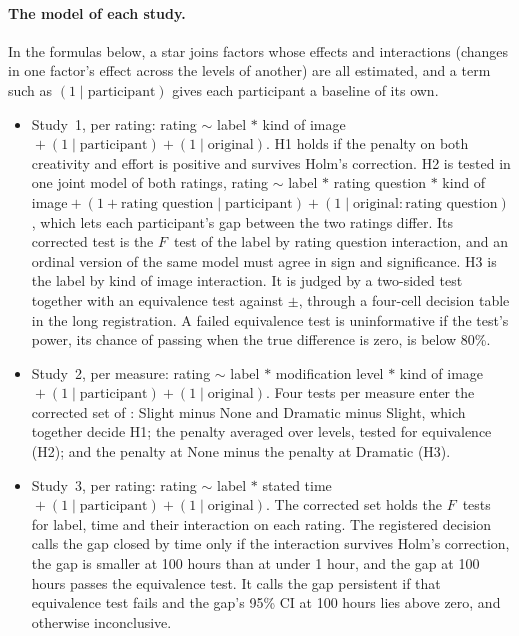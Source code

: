 \paragraph*{The model of each study.}
In the formulas below, a star joins factors whose effects and interactions (changes in one factor's effect across the levels of another) are all estimated, and a term such as $(1 \mid \textrm{participant})$ gives each participant a baseline of its own.
\begin{itemize}\raggedright
\item Study~1, per rating: rating $\sim$ label $*$ kind of image${}+ (1 \mid \textrm{participant}) + (1 \mid \textrm{original})$. H1 holds if the penalty on both creativity and effort is positive and survives Holm's correction. H2 is tested in one joint model of both ratings, rating $\sim$ label $*$ rating question $*$ kind of image${}+ (1 + \textrm{rating question} \mid \textrm{participant}) + (1 \mid \textrm{original}{:}\textrm{rating question})$, which lets each participant's gap between the two ratings differ. Its corrected test is the $F$~test of the label by rating question interaction, and an ordinal version of the same model must agree in sign and significance. H3 is the label by kind of image interaction. It is judged by a two-sided test together with an equivalence test against $\pm$\SOneHThreeBound, through a four-cell decision table in the long registration. A failed equivalence test is uninformative if the test's power, its chance of passing when the true difference is zero, is below 80\%.
\item Study~2, per measure: rating $\sim$ label $*$ modification level $*$ kind of image${}+ (1 \mid \textrm{participant}) + (1 \mid \textrm{original})$. Four tests per measure enter the corrected set of \STwoNConfirmatory: Slight minus None and Dramatic minus Slight, which together decide H1; the penalty averaged over levels, tested for equivalence (H2); and the penalty at None minus the penalty at Dramatic (H3).
\item Study~3, per rating: rating $\sim$ label $*$ stated time${}+ (1 \mid \textrm{participant}) + (1 \mid \textrm{original})$. The corrected set holds the $F$~tests for label, time and their interaction on each rating. The registered decision calls the gap closed by time only if the interaction survives Holm's correction, the gap is smaller at 100 hours than at under 1 hour, and the gap at 100 hours passes the equivalence test. It calls the gap persistent if that equivalence test fails and the gap's 95\% CI at 100 hours lies above zero, and otherwise inconclusive.

\end{itemize}
